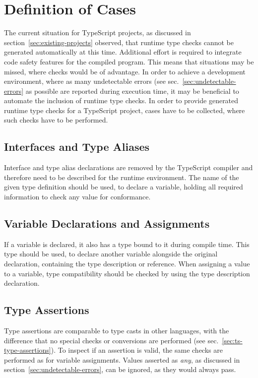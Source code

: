 \section{Definition of Cases}
\label{sec:type-check-situations}

The current situation for TypeScript projects, as discussed in section~\ref{sec:existing-projects} observed, that runtime type checks cannot be generated automatically at this time. Additional effort is required to integrate code safety features for the compiled program. This means that situations may be missed, where checks would be of advantage. In order to achieve a development environment, where as many undetectable errors (see sec.~\ref{sec:undetectable-errors} as possible are reported during execution time, it may be beneficial to automate the inclusion of runtime type checks. In order to provide generated runtime type checks for a TypeScript project, cases have to be collected, where such checks have to be performed.

\subsection{Interfaces and Type Aliases}

Interface and type alias declarations are removed by the TypeScript compiler and therefore need to be described for the runtime environment. The name of the given type definition should be used, to declare a variable, holding all required information to check any value for conformance.

\subsection{Variable Declarations and Assignments}

If a variable is declared, it also has a type bound to it during compile time. This type should be used, to declare another variable alongside the original declaration, containing the type description or reference. When assigning a value to a variable, type compatibility should be checked by using the type description declaration.

\subsection{Type Assertions}

Type assertions are comparable to type casts in other languages, with the difference that no special checks or conversions are performed (see sec.~\ref{sec:ts-type-assertions}). To inspect if an assertion is valid, the same checks are performed as for variable assignments. Values asserted as \emph{any}, as discussed in section~\ref{sec:undetectable-errors}, can be ignored, as they would always pass.


